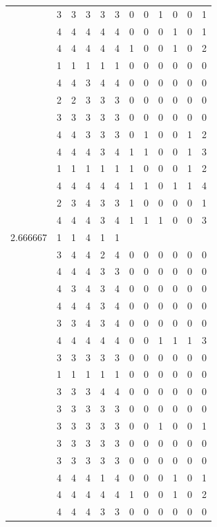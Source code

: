 \documentclass[]{book}
\theoremstyle{definition}
\theoremstyle{definition}
\theoremstyle{definition}
\theoremstyle{remark}
\begin{document}
\begin{table}
{\begin{tabular}[t]{rrrrrrrrrrrr}
 & 3 & 3 & 3 & 3 & 3 & 0 & 0 & 1 & 0 & 0 & 1\\
 & 4 & 4 & 4 & 4 & 4 & 0 & 0 & 0 & 1 & 0 & 1\\
 & 4 & 4 & 4 & 4 & 4 & 1 & 0 & 0 & 1 & 0 & 2\\
 & 1 & 1 & 1 & 1 & 1 & 0 & 0 & 0 & 0 & 0 & 0\\
 & 4 & 4 & 3 & 4 & 4 & 0 & 0 & 0 & 0 & 0 & 0\\
 & 2 & 2 & 3 & 3 & 3 & 0 & 0 & 0 & 0 & 0 & 0\\
 & 3 & 3 & 3 & 3 & 3 & 0 & 0 & 0 & 0 & 0 & 0\\
 & 4 & 4 & 3 & 3 & 3 & 0 & 1 & 0 & 0 & 1 & 2\\
 & 4 & 4 & 4 & 3 & 4 & 1 & 1 & 0 & 0 & 1 & 3\\
 & 1 & 1 & 1 & 1 & 1 & 1 & 0 & 0 & 0 & 1 & 2\\
 & 4 & 4 & 4 & 4 & 4 & 1 & 1 & 0 & 1 & 1 & 4\\
 & 2 & 3 & 4 & 3 & 3 & 1 & 0 & 0 & 0 & 0 & 1\\
 & 4 & 4 & 4 & 3 & 4 & 1 & 1 & 1 & 0 & 0 & 3\\
2.666667 & 1 & 1 & 4 & 1 & 1 &  &  &  &  &  & \\
 & 3 & 4 & 4 & 2 & 4 & 0 & 0 & 0 & 0 & 0 & 0\\
 & 4 & 4 & 4 & 3 & 3 & 0 & 0 & 0 & 0 & 0 & 0\\
 & 4 & 3 & 4 & 3 & 4 & 0 & 0 & 0 & 0 & 0 & 0\\
 & 4 & 4 & 4 & 3 & 4 & 0 & 0 & 0 & 0 & 0 & 0\\
 & 3 & 3 & 4 & 3 & 4 & 0 & 0 & 0 & 0 & 0 & 0\\
 & 4 & 4 & 4 & 4 & 4 & 0 & 0 & 1 & 1 & 1 & 3\\
 & 3 & 3 & 3 & 3 & 3 & 0 & 0 & 0 & 0 & 0 & 0\\
 & 1 & 1 & 1 & 1 & 1 & 0 & 0 & 0 & 0 & 0 & 0\\
 & 3 & 3 & 3 & 4 & 4 & 0 & 0 & 0 & 0 & 0 & 0\\
 & 3 & 3 & 3 & 3 & 3 & 0 & 0 & 0 & 0 & 0 & 0\\
 & 3 & 3 & 3 & 3 & 3 & 0 & 0 & 1 & 0 & 0 & 1\\
 & 3 & 3 & 3 & 3 & 3 & 0 & 0 & 0 & 0 & 0 & 0\\
 & 3 & 3 & 3 & 3 & 3 & 0 & 0 & 0 & 0 & 0 & 0\\
 & 4 & 4 & 4 & 1 & 4 & 0 & 0 & 0 & 1 & 0 & 1\\
 & 4 & 4 & 4 & 4 & 4 & 1 & 0 & 0 & 1 & 0 & 2\\
 & 4 & 4 & 4 & 3 & 3 & 0 & 0 & 0 & 0 & 0 & 0\\

\end{tabular}}
\end{table}
\end{document}
